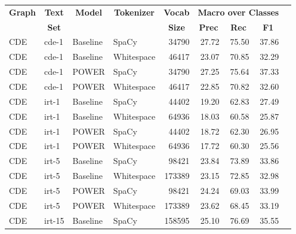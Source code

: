 \begin{tabular}{| l | l | l | l | r | r | r | r | r |}
    \hline

    \multicolumn{1}{|c|}{\textbf{Graph}} &
    \multicolumn{1}{|c|}{\textbf{Text}} &
    \multicolumn{1}{|c|}{\textbf{Model}} &
    \multicolumn{1}{|c|}{\textbf{Tokenizer}} &
    \multicolumn{1}{|c|}{\textbf{Vocab}} &
    \multicolumn{3}{|c|}{\textbf{Macro over Classes}} \\

    \multicolumn{1}{|c|}{} &
    \multicolumn{1}{|c|}{\textbf{Set}} &
    \multicolumn{1}{|c|}{} &
    \multicolumn{1}{|c|}{} &
    \multicolumn{1}{|c|}{\textbf{Size}} &
    \multicolumn{1}{|c|}{\textbf{Prec}} &
    \multicolumn{1}{|c|}{\textbf{Rec}} &
    \multicolumn{1}{|c|}{\textbf{F1}} \\

    \hline \hline

    CDE & cde-1 & Baseline & SpaCy & \num{34790} & 27.72 & 75.50 & 37.86 \\
    CDE & cde-1 & Baseline & Whitespace & \num{46417} & 23.07 & 70.85 & 32.29 \\
    CDE & cde-1 & POWER & SpaCy & \num{34790} & 27.25 & 75.64 & 37.33 \\
    CDE & cde-1 & POWER & Whitespace & \num{46417} & 22.85 & 70.82 & 32.60 \\ \hline

    CDE & irt-1 & Baseline & SpaCy & \num{44402} & 19.20 & 62.83 & 27.49 \\
    CDE & irt-1 & Baseline & Whitespace & \num{64936} & 18.03 & 60.58 & 25.87 \\
    CDE & irt-1 & POWER & SpaCy & \num{44402} & 18.72 & 62.30 & 26.95 \\
    CDE & irt-1 & POWER & Whitespace & \num{64936} & 17.72 & 60.30 & 25.56 \\ \hline

    CDE & irt-5 & Baseline & SpaCy & \num{98421} & 23.84 & 73.89 & 33.86 \\
    CDE & irt-5 & Baseline & Whitespace & \num{173389} & 23.15 & 72.85 & 32.98 \\
    CDE & irt-5 & POWER & SpaCy & \num{98421} & 24.24 & 69.03 & 33.99 \\
    CDE & irt-5 & POWER & Whitespace & \num{173389} & 23.62 & 68.45 & 33.19 \\ \hline

    CDE & irt-15 & Baseline & SpaCy & \num{158595} &
    25.10 & 76.69 & 35.55 \\


\end{tabular}
